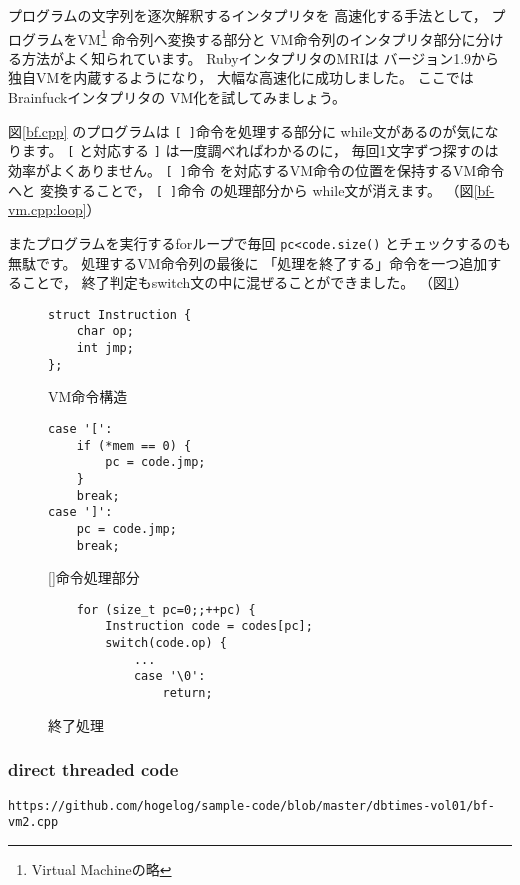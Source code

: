 プログラムの文字列を逐次解釈するインタプリタを
高速化する手法として，
プログラムをVM\footnote{Virtual Machineの略}
命令列へ変換する部分と
VM命令列のインタプリタ部分に分ける方法がよく知られています。
RubyインタプリタのMRIは
バージョン1.9から
独自VMを内蔵するようになり，
大幅な高速化に成功しました。
ここではBrainfuckインタプリタの
VM化を試してみましょう。

図\ref{bf.cpp}
のプログラムは
\verb|[ ]|命令を処理する部分に
while文があるのが気になります。
\verb|[|
と対応する
\verb|]|
は一度調べればわかるのに，
毎回1文字ずつ探すのは効率がよくありません。
\verb|[ ]|命令
を対応するVM命令の位置を保持するVM命令へと
変換することで，
\verb|[ ]|命令
の処理部分から
while文が消えます。
（図\ref{bf-vm.cpp:loop}）

またプログラムを実行するforループで毎回
\verb|pc<code.size()|
とチェックするのも無駄です。
処理するVM命令列の最後に
「処理を終了する」命令を一つ追加することで，
終了判定もswitch文の中に混ぜることができました。
（図\ref{bf-vm.cpp:finish}）

\begin{figure}[hbt]
\begin{minipage}{0.3\hsize}
{\scriptsize
\begin{verbatim}
struct Instruction {
    char op;
    int jmp;
};
\end{verbatim}
}
\caption{
VM命令構造
}
\label{bf-vm.cpp:structure}
\end{minipage}
\begin{minipage}{0.3\hsize}
{\scriptsize
\begin{verbatim}
case '[':
    if (*mem == 0) {
        pc = code.jmp;
    }   
    break;
case ']':
    pc = code.jmp;
    break;
\end{verbatim}
}
\caption{
[]命令処理部分
}
\label{bf-vm.cpp:loop}
\end{minipage}
\begin{minipage}{0.3\hsize}
{\scriptsize
\begin{verbatim}
    for (size_t pc=0;;++pc) {
        Instruction code = codes[pc];
        switch(code.op) {
            ...
            case '\0':
                return;
\end{verbatim}
}
\caption{
終了処理
}
\label{bf-vm.cpp:finish}
\end{minipage}
\end{figure}


\subsubsection{direct threaded code}
{\scriptsize
\verb|https://github.com/hogelog/sample-code/blob/master/dbtimes-vol01/bf-vm2.cpp|
}

